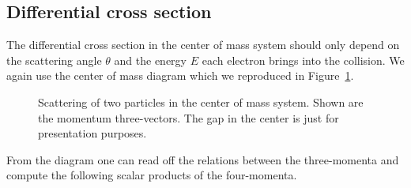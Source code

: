 \documentclass[11pt, english, fleqn, DIV=15, headinclude, BCOR=1cm]{scrartcl}
\begin{document}
\subsection{Differential cross section}

The differential cross section in the center of mass system should only depend
on the scattering angle $\theta$ and the energy $E$ each electron brings into
the collision. We again use the center of mass diagram which we reproduced in
Figure~\ref{fig:center_of_mass}.

\begin{figure}[hbp]
    \centering
    \caption{%
        Scattering of two particles in the center of mass system. Shown are the
        momentum three-vectors. The gap in the center is just for presentation
        purposes.
    }
    \label{fig:center_of_mass}
\end{figure}

From the diagram one can read off the relations between the three-momenta and
compute the following scalar products of the four-momenta.
\end{document}
